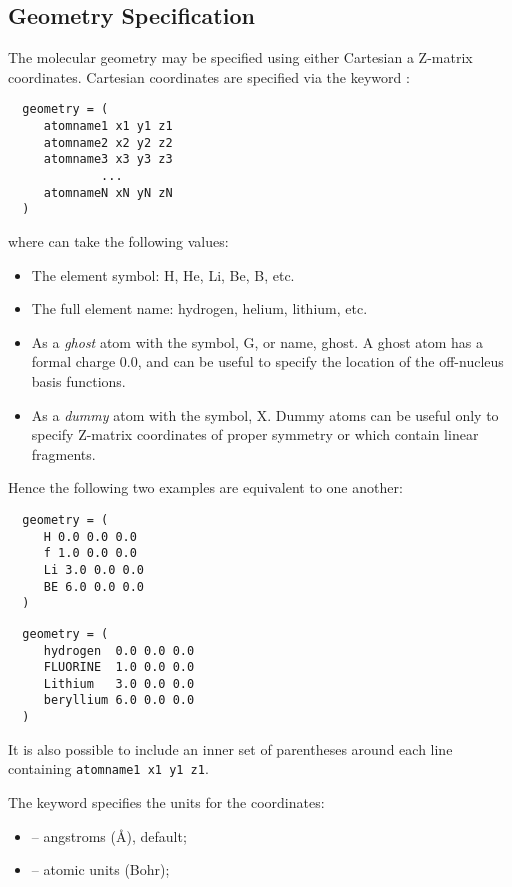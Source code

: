 \subsection{Geometry Specification}
The molecular geometry may be specified using either Cartesian a
Z-matrix coordinates.  Cartesian coordinates are specified via the
keyword :
\begin{verbatim}
  geometry = (
     atomname1 x1 y1 z1 
     atomname2 x2 y2 z2 
     atomname3 x3 y3 z3 
             ...
     atomnameN xN yN zN 
  )
\end{verbatim}
where  can take the following values:
\begin{itemize}
\item The element symbol: H, He, Li, Be, B, etc.
\item The full element name: hydrogen, helium, lithium, etc.
\item As a {\em ghost} atom with the symbol, G, or name, ghost. A
ghost atom has a formal charge 0.0, and can be useful to specify the
location of the off-nucleus basis functions.
\item As a {\em dummy} atom with the symbol, X.  Dummy atoms can be
useful only to specify Z-matrix coordinates of proper symmetry or
which contain linear fragments.
\end{itemize}
Hence the following two examples are equivalent to one another:
\begin{verbatim}
  geometry = (
     H 0.0 0.0 0.0 
     f 1.0 0.0 0.0 
     Li 3.0 0.0 0.0 
     BE 6.0 0.0 0.0 
  )
\end{verbatim}
\begin{verbatim}
  geometry = (
     hydrogen  0.0 0.0 0.0 
     FLUORINE  1.0 0.0 0.0 
     Lithium   3.0 0.0 0.0 
     beryllium 6.0 0.0 0.0 
  )
\end{verbatim}
It is also possible to include an inner set 
of parentheses around each line containing {\tt atomname1 x1 y1 z1}.

The keyword  specifies the units for the coordinates:
\begin{itemize}
\item {} -- angstroms (\AA), default;
\item {} -- atomic units (Bohr);
\end{itemize}

